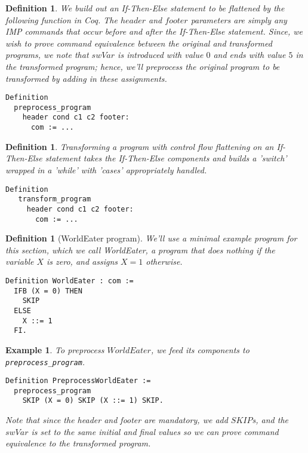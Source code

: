 \documentclass[compsoc,conference,a4paper,10pt,times]{IEEEtran}
\newtheorem{defin}[theorem]{Definition}
\newtheorem{example}[theorem]{Example}
\begin{document}
\begin{defin}
We build out an If-Then-Else statement to be flattened by the following function in Coq. The $header$ and $footer$ parameters are simply any IMP commands that occur before and after the If-Then-Else statement. Since, we wish to prove command equivalence between the original and transformed programs, we note that $swVar$ is introduced with value $0$ and ends with value $5$ in the transformed program; hence, we'll preprocess the original program to be transformed by adding in these assignments.
 
\begin{verbatim}
Definition 
  preprocess_program 
    header cond c1 c2 footer: 
      com := ... 
 \end{verbatim}
\end{defin}

\begin{defin}
Transforming a program with control flow flattening on an If-Then-Else statement takes the If-Then-Else components and builds a 'switch' wrapped in a 'while' with 'cases' appropriately handled.
\begin{verbatim}
Definition 
   transform_program 
     header cond c1 c2 footer: 
       com := ...
\end{verbatim}
\end{defin}

\begin{defin}[WorldEater program]
We'll use a minimal example program for this section, which we call \emph{WorldEater}, a program that does nothing if the variable $X$ is zero, and assigns $X=1$ otherwise.

\begin{verbatim}
Definition WorldEater : com :=
  IFB (X = 0) THEN
    SKIP
  ELSE
    X ::= 1
  FI.
\end{verbatim}
\end{defin}

\begin{example}
To preprocess $WorldEater$, we feed its components to \verb$preprocess_program$.
\begin{verbatim}
Definition PreprocessWorldEater := 
  preprocess_program 
    SKIP (X = 0) SKIP (X ::= 1) SKIP.
\end{verbatim}

Note that since the header and footer are mandatory, we add $SKIP$s, and the $swVar$ is set to the same initial and final values so we can prove command equivalence to the transformed program.
\end{example}
\end{document}
